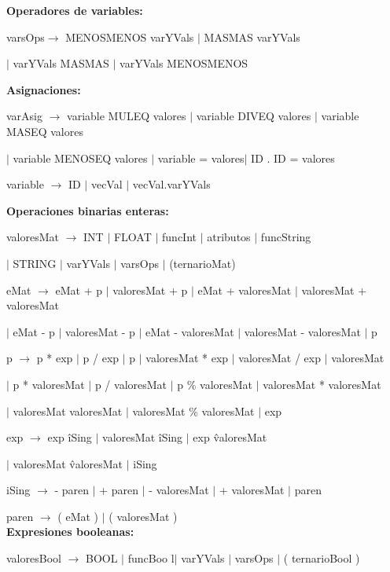 \textbf{Operadores de variables:}

varsOps$\rightarrow$ MENOSMENOS varYVals $|$ MASMAS varYVals

\hspace{15mm}$|$ varYVals MASMAS $|$ varYVals MENOSMENOS 


\textbf{Asignaciones:} 

  varAsig $\rightarrow$ variable MULEQ valores $|$ variable DIVEQ valores $|$ variable MASEQ valores
  
  \hspace{15mm}$|$ variable MENOSEQ valores $|$ variable = valores$|$ ID . ID = valores 


variable $\rightarrow$ ID $|$ vecVal $|$ vecVal.varYVals 


\textbf{Operaciones binarias enteras:} 

 valoresMat $\rightarrow$ INT $|$ FLOAT $|$ funcInt $|$ atributos $|$ funcString
 
  \hspace{15mm} $|$ STRING $|$ varYVals $|$ varsOps $|$ (ternarioMat)  
  
 
eMat $\rightarrow$ eMat + p $|$ valoresMat + p $|$ eMat + valoresMat $|$ valoresMat + valoresMat
  
  \hspace{15mm} $|$ eMat - p  $|$ valoresMat - p  $|$ eMat - valoresMat $|$ valoresMat - valoresMat $|$ p
  
 p $\rightarrow$ p * exp $|$ p / exp $|$ p  $|$ valoresMat * exp $|$ valoresMat / exp $|$ valoresMat 
 
   \hspace{15mm} $|$ p * valoresMat $|$ p / valoresMat $|$ p \% valoresMat $|$ valoresMat * valoresMat
   
   \hspace{15mm} $|$ valoresMat \/ valoresMat $|$ valoresMat \% valoresMat $|$ exp
    
 exp $\rightarrow$ exp \^ iSing $|$ valoresMat \^ iSing $|$ exp \^ valoresMat
 
 \hspace{15mm} $|$ valoresMat \^ valoresMat $|$ iSing
  
iSing $\rightarrow$ - paren $|$ + paren $|$ - valoresMat $|$ + valoresMat $|$ paren
  
  
 paren $\rightarrow$ ( eMat )  $|$ ( valoresMat ) \\
  
  
\textbf{Expresiones booleanas:} 

valoresBool $\rightarrow$ BOOL $|$ funcBoo l$|$ varYVals $|$ varsOps $|$ (  ternarioBool )  
 
